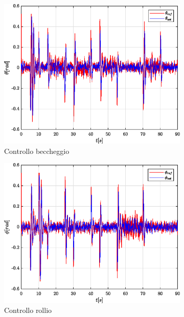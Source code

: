 \begin{figure}
	\centering
	\begin{subfigure}{0.45\textwidth}
		\centering
		\includegraphics[width=1\textwidth]{Simulazioni/Figure/SMC/SNAKE_MIL/AttitudeControlPitch}
		\caption{Controllo beccheggio}
	\end{subfigure}
	\hfill
	\begin{subfigure}{0.45\textwidth}
		\centering
		\includegraphics[width=1\textwidth]{Simulazioni/Figure/SMC/SNAKE_MIL/AttitudeControlRoll}
		\caption{Controllo rollio}
	\end{subfigure}
	\hfill
	\begin{subfigure}{0.45\textwidth}

\end{subfigure}
\end{figure}
